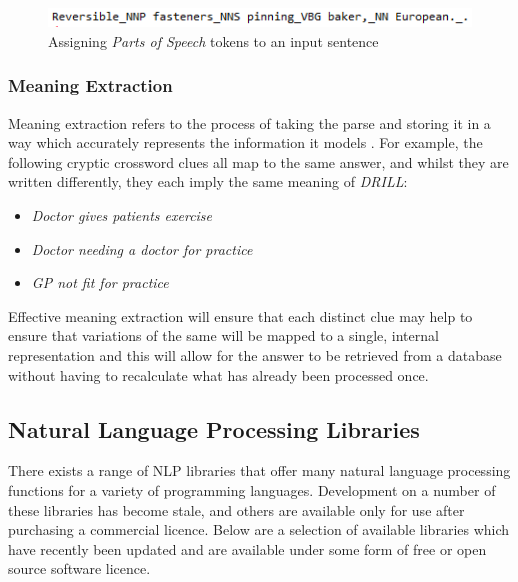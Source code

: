 \begin{figure}[H]
	\centering
	\includegraphics[width=\linewidth]{pos_tagging.png}
	\caption{Assigning \emph{Parts of Speech} tokens to an input sentence}
\end{figure}

\subsubsection{Meaning Extraction}

Meaning extraction refers to the process of taking the parse and storing it in a
way which accurately represents the information it models \citep{mccluskey99}.
For example, the following cryptic crossword clues all map to the same answer,
and whilst they are written differently, they each imply the same meaning of
\emph{DRILL}:

\begin{itemize}
	\item \emph{Doctor gives patients exercise}
	\item \emph{Doctor needing a doctor for practice}
	\item \emph{GP not fit for practice}
\end{itemize}

\begin{flushright}
	\citep{gordius03}
\end{flushright}

Effective meaning extraction will ensure that each distinct clue may help to
ensure that variations of the same will be mapped to a single, internal
representation and this will allow for the answer to be retrieved from a
database without having to recalculate what has already been processed once.

\subsection{Natural Language Processing Libraries}

There exists a range of NLP libraries that offer many natural language
processing functions for a variety of programming languages. Development on a
number of these libraries has become stale, and others are available only for
use after purchasing a commercial licence. Below are a selection of available
libraries which have recently been updated and are available under some form of
free or open source software licence.

